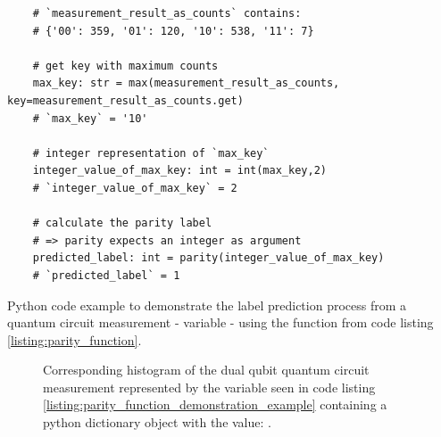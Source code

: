 \begin{listing}[!ht]
    \begin{verbatim}
    # `measurement_result_as_counts` contains: 
    # {'00': 359, '01': 120, '10': 538, '11': 7}
    
    # get key with maximum counts
    max_key: str = max(measurement_result_as_counts, key=measurement_result_as_counts.get)
    # `max_key` = '10'
    
    # integer representation of `max_key`
    integer_value_of_max_key: int = int(max_key,2)
    # `integer_value_of_max_key` = 2
    
    # calculate the parity label
    # => parity expects an integer as argument
    predicted_label: int = parity(integer_value_of_max_key)
    # `predicted_label` = 1
    \end{verbatim}
    \caption{Python code example to demonstrate the label prediction process from a quantum circuit measurement - variable  - using the  function from code listing \ref{listing:parity_function}.}
    \label{listing:parity_function_demonstration_example}
\end{listing}

\begin{figure}[!h]
    \centering
    \caption{Corresponding histogram of the dual qubit quantum circuit measurement represented by the variable seen in code listing \ref{listing:parity_function_demonstration_example} containing a python dictionary object with the value: .}
    \label{figure:parity_function_example_histogram}
\end{figure}


